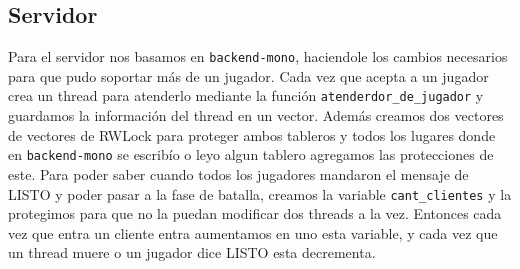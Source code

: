 \documentclass[hidelinks,a4paper,12pt, nofootinbib]{article}
\begin{document}
\subsection{Servidor}
Para el servidor nos basamos en \texttt{backend-mono}, haciendole los cambios necesarios para que pudo soportar más de un jugador. 
Cada vez que acepta a un jugador crea un thread para atenderlo mediante la función \texttt{atenderdor\_de\_jugador} y guardamos la información del thread en un vector. Además creamos dos vectores de vectores de RWLock para proteger ambos tableros y todos los lugares donde en \texttt{backend-mono} se escribío o leyo algun tablero agregamos las protecciones de este.
Para poder saber cuando todos los jugadores mandaron el mensaje de LISTO y poder pasar a la fase de batalla, creamos la variable \texttt{cant\_clientes} y la protegimos para que no la puedan modificar dos threads a la vez. Entonces cada vez que entra un cliente entra aumentamos en uno esta variable, y cada vez que un thread muere o un jugador dice LISTO esta decrementa.
\end{document}
